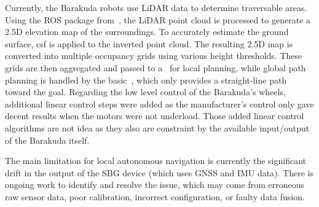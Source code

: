 Currently, the Barakuda robots use LiDAR data to determine traversable areas.
Using the ROS package from~\cite{miki_elevation_2022}, the LiDAR point cloud is processed to generate a 2.5D elevation map of the surroundings.
To accurately estimate the ground surface, \gls{csf} is applied to the inverted point cloud.
The resulting 2.5D map is converted into multiple occupancy grids using various height thresholds.
These grids are then aggregated and passed to a~\cite{noauthor_teb_local_planner_nodate} for local planning, while
global path planning is handled by the basic~\cite{noauthor_carrot_planner_nodate}, which only provides a straight-line path toward the goal.
Regarding the low level control of the Barakuda's wheels, additional linear control steps were added as the manufacturer's
control only gave decent results when the motors were not underload.
Those added linear control algorithms are not idea as they also are constraint by the available input/output of the
Barakuda itself.

The main limitation for local autonomous navigation is currently the significant drift in the output of the SBG device (which uses GNSS and IMU data).
There is ongoing work to identify and resolve the issue, which may come from erroneous raw sensor data, poor calibration, incorrect configuration, or faulty data fusion.

